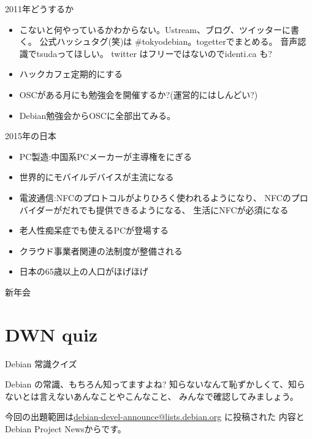 \begin{frame}{2011年どうするか}

\begin{itemize}
 \item こないと何やっているかわからない。Ustream、ブログ、ツイッターに書
       く。
       公式ハッシュタグ(笑)は \#tokyodebian。togetterでまとめる。
       音声認識でtsudaってほしい。
       twitter はフリーではないのでidenti.ca も?
 \item ハックカフェ定期的にする
 \item OSCがある月にも勉強会を開催するか?(運営的にはしんどい?)
 \item Debian勉強会からOSCに全部出てみる。
\end{itemize}

\end{frame}
 
\begin{frame}{2015年の日本}

\begin{itemize}
 \item PC製造:中国系PCメーカーが主導権をにぎる
 \item 世界的にモバイルデバイスが主流になる
 \item 電波通信:NFCのプロトコルがよりひろく使われるようになり、
       NFCのプロバイダーがだれでも提供できるようになる、
       生活にNFCが必須になる
 \item 老人性痴呆症でも使えるPCが登場する
 \item クラウド事業者関連の法制度が整備される
 \item 日本の65歳以上の人口がほげほげ

\end{itemize}

\end{frame}

\begin{frame}{新年会}

\end{frame}

{\footnotesize
%
}

\section{DWN quiz}
\begin{frame}{Debian 常識クイズ}

Debian の常識、もちろん知ってますよね?
知らないなんて恥ずかしくて、知らないとは言えないあんなことやこんなこと、
みんなで確認してみましょう。

今回の出題範囲は\url{debian-devel-announce@lists.debian.org} に投稿された
内容とDebian Project Newsからです。

\end{frame}

